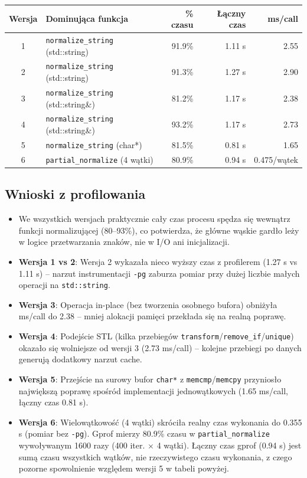 \documentclass{article}
\begin{document}
\begin{center}
\begin{tabular}{|c|l|r|r|r|}
\hline
\textbf{Wersja} & \textbf{Dominująca funkcja} & \textbf{\% czasu} & \textbf{Łączny czas} & \textbf{ms/call} \\
\hline
1 & \texttt{normalize\_string} (std::string)   & 91.9\% & 1.11 s & 2.55 \\
2 & \texttt{normalize\_string} (std::string)   & 91.3\% & 1.27 s & 2.90 \\
3 & \texttt{normalize\_string} (std::string\&) & 81.2\% & 1.17 s & 2.38 \\
4 & \texttt{normalize\_string} (std::string\&) & 93.2\% & 1.17 s & 2.73 \\
5 & \texttt{normalize\_string} (char*)         & 81.5\% & 0.81 s & 1.65 \\
6 & \texttt{partial\_normalize} (4 wątki)      & 80.9\% & 0.94 s & 0.475/wątek \\
\hline
\end{tabular}
\end{center}

\subsection*{Wnioski z profilowania}

\begin{itemize}
    \item We wszystkich wersjach praktycznie cały czas procesu spędza się wewnątrz funkcji normalizującej (80--93\%), co potwierdza, że główne wąskie gardło leży w logice przetwarzania znaków, nie w I/O ani inicjalizacji.
    \item \textbf{Wersja 1 vs 2}: Wersja 2 wykazała nieco wyższy czas z profilerem (1.27 s vs 1.11 s) -- narzut instrumentacji \texttt{-pg} zaburza pomiar przy dużej liczbie małych operacji na \texttt{std::string}.
    \item \textbf{Wersja 3}: Operacja in-place (bez tworzenia osobnego bufora) obniżyła ms/call do 2.38 -- mniej alokacji pamięci przekłada się na realną poprawę.
    \item \textbf{Wersja 4}: Podejście STL (kilka przebiegów \texttt{transform}/\texttt{remove\_if}/\texttt{unique}) okazało się wolniejsze od wersji 3 (2.73 ms/call) -- kolejne przebiegi po danych generują dodatkowy narzut cache.
    \item \textbf{Wersja 5}: Przejście na surowy bufor \texttt{char*} z \texttt{memcmp}/\texttt{memcpy} przyniosło największą poprawę spośród implementacji jednowątkowych (1.65 ms/call, łączny czas 0.81 s).
    \item \textbf{Wersja 6}: Wielowątkowość (4 wątki) skróciła realny czas wykonania do 0.355 s (pomiar bez \texttt{-pg}). Gprof mierzy 80.9\% czasu w \texttt{partial\_normalize} wywoływanym 1600 razy (400 iter. $\times$ 4 wątki). Łączny czas gprof (0.94 s) jest sumą czasu wszystkich wątków, nie rzeczywistego czasu wykonania, z czego pozorne spowolnienie względem wersji 5 w tabeli powyżej.
\end{itemize}
\newpage
\end{document}
